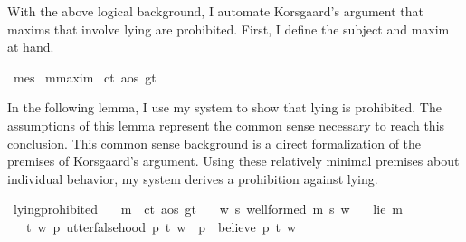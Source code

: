 \begin{isabellebody}
\begin{isamarkuptext}
With the above logical background, I automate Korsgaard's argument that maxims that involve
lying are prohibited. First, I define the subject and maxim at hand.%
\end{isamarkuptext}\isamarkuptrue%
\isamarkupfalse%
\ me{\isacharcolon}{\isacharcolon}s\isanewline
%
\isanewline
{}\isamarkupfalse%
\ m{\isacharcolon}{\isacharcolon}maxim\isanewline
%
\isanewline
{}\isamarkupfalse%
\ c{\isacharcolon}{\isacharcolon}t\ a{\isacharcolon}{\isacharcolon}os\ g{\isacharcolon}{\isacharcolon}t\isanewline
%
%
\begin{isamarkuptext}%
In the following lemma, I use my system to show that lying is prohibited. The assumptions of 
this lemma represent the common sense necessary to reach this conclusion. This
common sense background is a direct formalization of the premises of Korsgaard's argument. Using these
relatively minimal premises about individual behavior, my system derives a prohibition against lying.%
\end{isamarkuptext}\isamarkuptrue%
\isamarkupfalse%
\ lying{\isacharunderscore}prohibited{\isacharcolon}\isanewline
\ \ \ {\isachardoublequoteopen}m\ {\isasymequiv}\ {\isacharparenleft}c{\isacharcolon}{\isacharcolon}t{\isacharcomma}\ a{\isacharcolon}{\isacharcolon}os{\isacharcomma}\ g{\isacharcolon}{\isacharcolon}t{\isacharparenright}{\isachardoublequoteclose}\isanewline
\ \ \ {\isachardoublequoteopen}{\isasymforall}w{\isachardot}\ {\isasymforall}s{\isachardot}\ well{\isacharunderscore}formed\ m\ s\ w{\isachardoublequoteclose}\isanewline
%
\isanewline
\ \ \ {\isachardoublequoteopen}lie\ m{\isachardoublequoteclose}\isanewline
%
\isanewline
\ \ \ {\isachardoublequoteopen}{\isasymforall}t\ w{\isachardot}\ {\isacharparenleft}{\isacharparenleft}{\isasymforall}p{\isachardot}\ utter{\isacharunderscore}falsehood\ p\ t\ w{\isacharparenright}\ {\isasymlongrightarrow}\ {\isacharparenleft}{\isasymforall}p{\isachardot}\ \isactrlbold {\isasymnot}\ {\isacharparenleft}believe\ p\ t{\isacharparenright}\ w{\isacharparenright}{\isacharparenright}{\isachardoublequoteclose}\isanewline

\end{isabellebody}
